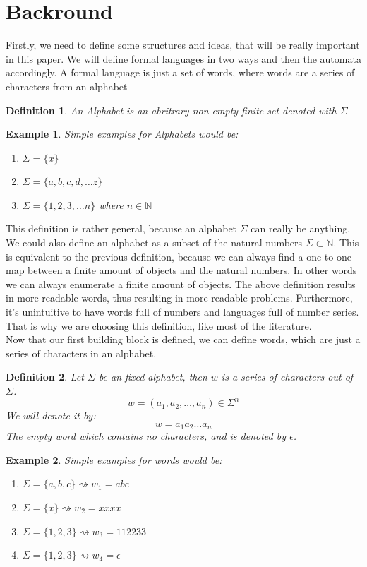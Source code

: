 \documentclass[12pt,letterpaper]{article}
\newtheorem{definition}{Definition}
\newtheorem{example}{Example}[section]
\begin{document}
\section{Backround}
Firstly, we need to define some structures and ideas, 
that will be really important in this paper.
We will define  formal languages in two ways and then 
the automata accordingly. 
A formal language is just a set of words, where words are
a series of characters from an alphabet
\begin{definition}
  An Alphabet is an abritrary non empty finite set denoted with $\Sigma$
\end{definition}
\begin{example} Simple examples for Alphabets would be:
  \begin{enumerate}
    \item $\Sigma = \{x\}$
    \item $\Sigma = \{a,b,c,d, \dots z \}$
    \item $\Sigma = \{1,2,3, \dots n \}$ where $n \in \mathbb{N}$
  \end{enumerate}
\end{example}
This definition is rather general, because an alphabet $\Sigma$
can really be anything. We could also define an alphabet as a subset of
the natural numbers $\Sigma \subset \mathbb{N}$. This is equivalent to
the previous definition, because we can always find a one-to-one map between
a finite amount of objects and the natural numbers. In other words 
we can always enumerate a finite amount of objects. The above definition
results in more readable words, thus resulting in more readable problems.
Furthermore, it's unintuitive to have words full of numbers and languages full of number series. That is why we are choosing this definition, like most
of the literature.\\
Now that our first building block is defined, we can define words, which are just
a series of characters in an alphabet.
\begin{definition}
  Let $\Sigma$ be an fixed alphabet, then $w$ is a series of characters out of
  $\Sigma$. 
  \[
    w = (a_1,a_2, \dots, a_n) \in \Sigma^n
  \]
  We will denote it by:
  \[
    w = a_1a_2\dots a_n
  \]
  The empty word which contains no characters, 
  and is denoted by $\epsilon$.
\end{definition}
\begin{example}
  Simple examples for words would be:
  \begin{enumerate}
    \item $\Sigma = \{a,b,c\} \rightsquigarrow w_1 = abc$
    \item $\Sigma = \{x\} \rightsquigarrow w_2 = xxxx$
    \item $\Sigma = \{1,2,3\} \rightsquigarrow w_3 = 112233$
    \item $\Sigma = \{1,2,3\} \rightsquigarrow w_4 = \epsilon$
  \end{enumerate}
\end{example}
\end{document}
